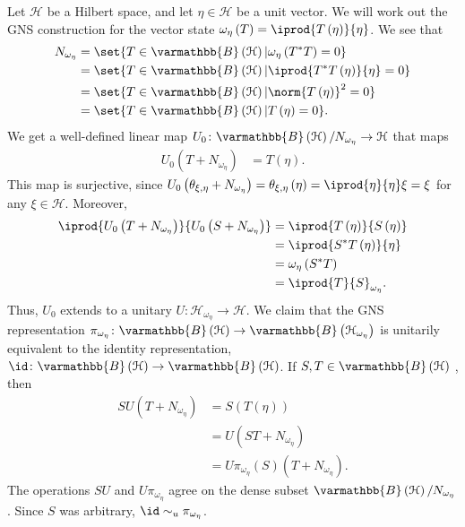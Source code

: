 \documentclass[10pt]{mypackage}
\renewcommand*{\mathbb}[1]{\varmathbb{#1}}
\newcommand{\B}{\mathbb{B}}
\begin{document}
\begin{example}
  Let $\mathcal{H}$ be a Hilbert space, and let $\eta\in \mathcal{H}$ be a unit vector. We will work out the GNS construction for the vector state $\omega_{\eta}\left(T\right) = \iprod{T\left(\eta\right)}{\eta}$. We see that
  \begin{align*}
    N_{\omega_{\eta}} &= \set{T\in\B\left(\mathcal{H}\right) | \omega_{\eta}\left(T^{\ast}T\right) = 0}\\
                      &= \set{T\in\B\left(\mathcal{H}\right) | \iprod{T^{\ast}T\left(\eta\right)}{\eta} = 0}\\
                      &= \set{T\in \B\left(\mathcal{H}\right) | \norm{T\left(\eta\right)}^2 = 0}\\
                      &= \set{T\in \B\left(\mathcal{H}\right) | T\left(\eta\right) = 0}.
  \end{align*}
  We get a well-defined linear map $U_0\colon \B\left(\mathcal{H}\right)/N_{\omega_{\eta}} \rightarrow \mathcal{H}$ that maps
  \begin{align*}
    U_0\left(T + N_{\omega_{\eta}}\right) &= T\left(\eta\right).
  \end{align*}
  This map is surjective, since $U_0\left(\theta_{\xi,\eta} + N_{\omega_{\eta}}\right) = \theta_{\xi,\eta}\left(\eta\right) = \iprod{\eta}{\eta}\xi = \xi$ for any $\xi\in \mathcal{H}$. Moreover, 
  \begin{align*}
    \iprod{U_0\left(T + N_{\omega_{\eta}}\right)}{ U_0\left(S + N_{\omega_{\eta}}\right) } &= \iprod{T\left(\eta\right)}{S\left(\eta\right)}\\
                                                                                           &= \iprod{S^{\ast}T\left(\eta\right)}{\eta}\\
                                                                                           &= \omega_{\eta}\left(S^{\ast}T\right)\\
                                                                                           &= \iprod{T}{S}_{\omega_{\eta}}.
  \end{align*}
  Thus, $U_0$ extends to a unitary $U\colon \mathcal{H}_{\omega_{\eta}}\rightarrow \mathcal{H}$. We claim that the GNS representation $\pi_{\omega_{\eta}}\colon \B\left(\mathcal{H}\right)\rightarrow \B\left(\mathcal{H}_{\omega_{\eta}}\right)$ is unitarily equivalent to the identity representation, $\id\colon \B\left(\mathcal{H}\right)\rightarrow \B\left(\mathcal{H}\right)$. If $S,T\in \B\left(\mathcal{H}\right)$ , then
  \begin{align*}
    SU\left(T + N_{\omega_{\eta}}\right) &= S\left(T\left(\eta\right)\right)\\
                                         &= U\left(ST + N_{\omega_{\eta}}\right)\\
                                         &= U\pi_{\omega_{\eta}}\left(S\right)\left(T + N_{\omega_{\eta}}\right).
  \end{align*}
  The operations $SU$ and $U\pi_{\omega_{\eta}}$ agree on the dense subset $\B\left(\mathcal{H}\right)/N_{\omega_{\eta}}$. Since $S$ was arbitrary, $\id\sim_{u}\pi_{\omega_{\eta}}$.
\end{example}
\end{document}
